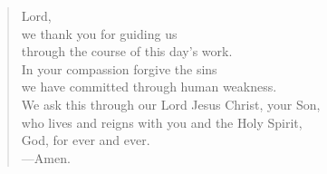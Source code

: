 \prayer

\setlength{\leftmargini}{\prayerleftmargini}

\begin{verse}
Lord,\\
we thank you for guiding us\\
through the course of this day’s work.\\
In your compassion forgive the sins\\
we have committed through human weakness.\\
We ask this through our Lord Jesus Christ, your Son,\\
who lives and reigns with you and the Holy Spirit,\\
God, for ever and ever.\\
{\color{red}---\thinspace}Amen.
\end{verse}

\setlength{\leftmargini}{\defleftmargini}